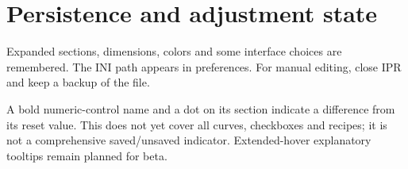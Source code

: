 \section{Persistence and adjustment state}
Expanded sections, dimensions, colors and some interface choices are remembered.
The INI path appears in preferences. For manual editing, close IPR and keep
a backup of the file.

A bold numeric-control name and a dot on its section indicate a difference
from its reset value. This does not yet cover all curves, checkboxes and
recipes; it is not a comprehensive saved/unsaved indicator.
Extended-hover explanatory tooltips remain planned for beta.

